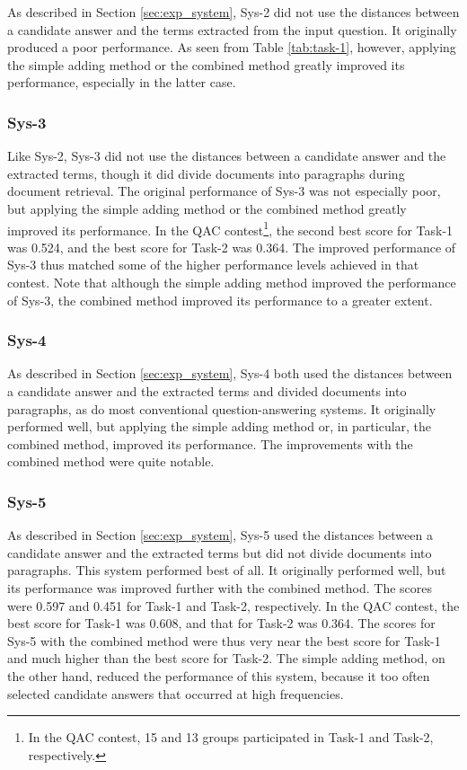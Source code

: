 As described in Section \ref{sec:exp_system},
Sys-2 did not use the distances between a candidate answer 
and the terms extracted from the input question. 
It originally produced a poor performance. 
As seen from Table \ref{tab:task-1}, however, 
applying the simple adding method or 
the combined method greatly improved its performance, 
especially in the latter case. 

\subsubsection{Sys-3}

Like Sys-2, 
Sys-3 did not use the distances between a candidate answer 
and the extracted terms, though it did 
divide documents into paragraphs during document retrieval.
The original performance of Sys-3 was not especially poor, 
but applying the simple adding method or 
the combined method greatly improved its performance. 
In the QAC contest\footnote{In the QAC contest, 
15 and 13 groups participated in Task-1 and 
Task-2, respectively.}, the second best score for Task-1 was 0.524, and 
the best score for Task-2 was 0.364. 
The improved performance of Sys-3 thus matched some of the higher 
performance levels achieved in that contest. 
Note that although the simple adding method 
improved the performance of Sys-3, 
the combined method improved its performance to a greater extent. 

\subsubsection{Sys-4}

As described in Section \ref{sec:exp_system}, 
Sys-4 both used the distances between a candidate answer 
and the extracted terms and 
divided documents into paragraphs, 
as do most conventional question-answering systems. 
It originally performed well, but
applying the simple adding method or, 
in particular, the combined method, improved its performance. 
The improvements with the combined method 
were quite notable. 

\subsubsection{Sys-5}

As described in Section \ref{sec:exp_system}, 
Sys-5 used the distances between a candidate answer 
and the extracted terms but
did not divide documents into paragraphs. 
This system performed best of all. 
It originally performed well, but 
its performance was improved further 
with the combined method. 
The scores were 0.597 and 0.451 for Task-1 and Task-2, respectively. 
In the QAC contest, the best score for Task-1 was 0.608, and 
that for Task-2 was 0.364. 
The scores for Sys-5 with the combined method 
were thus very near the best score for Task-1 and 
much higher than the best score for Task-2. 
The simple adding method, on the other hand, reduced the performance 
of this system, 
because it 
too often selected candidate answers that occurred at high frequencies. 

